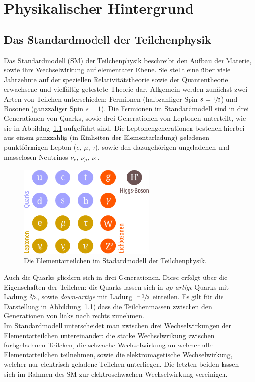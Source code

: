 \chapter{Physikalischer Hintergrund}
\label{chap:2}
%
\section{Das Standardmodell der Teilchenphysik}
%
Das Standardmodell (SM) der Teilchenphysik beschreibt den Aufbau der Materie, sowie ihre Wechselwirkung auf elementarer Ebene. Sie stellt eine über viele Jahrzehnte auf der speziellen Relativitätstheorie sowie der Quantentheorie erwachsene und vielfältig getestete Theorie dar. Allgemein werden zunächst zwei Arten von Teilchen unterschieden: Fermionen (halbzahliger Spin $s=\sfrac{1}{2}$) und Bosonen (ganzzaliger Spin $s=1$). Die Fermionen im Standardmodell sind in drei Generationen von Quarks, sowie drei Generationen von Leptonen unterteilt, wie sie in Abbildng~\ref{fig:particles} aufgeführt sind. Die Leptonengenerationen bestehen hierbei aus einem ganzzahlig (in Einheiten der Elementarladung) geladenen punktförmigen Lepton ($e$, $\mu$, $\tau$), sowie den dazugehörigen ungeladenen und masselosen Neutrinos $\nu_e$, $\nu_\mu$, $\nu_\tau$.
%
\begin{figure}
  \centering
      \includegraphics[width=0.6\textwidth]{Plots/SM.pdf}
  \caption{Die Elementarteilchen im Stadardmodell der Teilchenphysik.}
  \label{fig:particles}
\end{figure}
%
Auch die Quarks gliedern sich in drei Generationen. Diese erfolgt über die Eigenschaften der Teilchen: die Quarks lassen sich in \textit{up-artige} Quarks mit Ladung $\sfrac{2}{3}$, sowie \textit{down-artige} mit Ladung $\sfrac{-1}{3}$ einteilen. Es gilt für die Darstellung in Abbildung~\ref{fig:particles}) dass die Teilchenmassen zwischen den Generationen von links nach rechts zunehmen.\\
Im Standardmodell unterscheidet man zwischen drei Wechselwirkungen der Elementarteilchen untereinander: die starke Wechselwrikung zwischen farbgeladenen Teilchen, die schwache Wechselwirkung an welcher alle Elementarteilchen teilnehmen, sowie die elektromagetische Wechselwirkung, welcher nur elektrisch geladene Teilchen unterliegen. Die letzten beiden lassen sich im Rahmen des SM zur elektroschwachen Wechselwirkung vereinigen.
